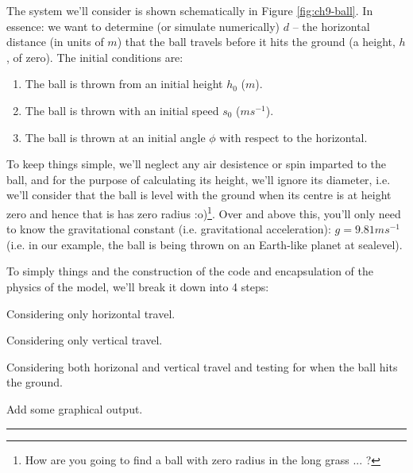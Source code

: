 \documentclass{tufte-book} %
\begin{document}
The system we'll consider is shown schematically in Figure \ref{fig:ch9-ball}. In essence: we want to determine (or simulate numerically) \(d\) -- the horizontal distance (in units of  \(m\)) that the ball travels before it hits the ground (a height, \(h\), of zero). The initial conditions are:
\begin{enumerate}[noitemsep]
\setlength{\itemindent}{.2in}
\item The ball is thrown from an initial height \(h_{0}\) (\(m\)).
\item The ball is thrown with an initial speed \(s_{0}\) (\(ms^{-1}\)).
\item The ball is thrown at an initial angle \(\phi\) with respect to the horizontal.
\end{enumerate}
To keep things simple, we'll neglect any air desistence or spin imparted to the ball, and for the purpose of calculating its height, we'll ignore its diameter, i.e. we'll consider that the ball is level with the ground when its centre is at height zero and hence that is has zero radius :o)\footnote{How are you going to find a ball with zero radius in the long grass ... ?}. Over and above this, you'll only need to know the gravitational constant (i.e. gravitational acceleration): \(g=9.81 ms^{-1}\) (i.e. in our example, the ball is being thrown on an Earth-like planet at sealevel).

To simply things and the construction of the code and encapsulation of the physics of the model, we'll break it down into 4 steps:

\begin{description}[align=right]

\setlength{\itemindent}{-0.2in}

\item [Part I] Considering only horizontal travel.

\item [Part II] Considering only vertical travel.

\item [Part III] Considering both horizonal and vertical travel and testing for when the ball hits the ground.

\item [Part IV] Add some graphical output.

\end{description}

\noindent\rule[0.0ex]{0.5\linewidth}{0.5pt}
\end{document}
